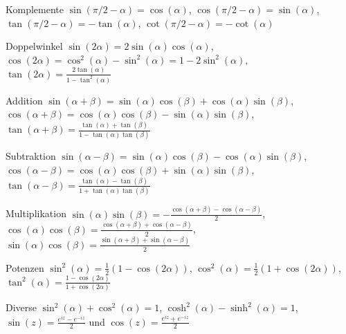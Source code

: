 \documentclass[a4paper,10pt]{article}
\begin{document}
\begin{subbox}{Komplemente}
$\sin(\pi/2 - \alpha) = \cos(\alpha)$, $\cos(\pi/2 - \alpha) = \sin(\alpha)$, $\tan(\pi/2 - \alpha) = -\tan(\alpha)$, $\cot(\pi/2 - \alpha) = -\cot(\alpha)$
\end{subbox}

\begin{subbox}{Doppelwinkel}
$\sin(2\alpha) = 2 \sin(\alpha) \cos(\alpha)$, $\cos(2\alpha) = \cos^2(\alpha) - \sin^2(\alpha) = 1 - 2 \sin^2(\alpha)$, $\tan(2\alpha) = \frac{2\tan(\alpha)}{1 - \tan^2(\alpha)}$
\end{subbox}

\begin{subbox}{Addition}
$\sin(\alpha + \beta) = \sin(\alpha) \cos(\beta) + \cos(\alpha) \sin(\beta)$, $\cos(\alpha + \beta) = \cos(\alpha) \cos(\beta) - \sin(\alpha) \sin(\beta)$, $\tan(\alpha + \beta) = \frac{\tan(\alpha) + \tan(\beta)}{1 - \tan(\alpha) \tan(\beta)}$
\end{subbox}

\begin{subbox}{Subtraktion}
$\sin(\alpha - \beta) = \sin(\alpha) \cos(\beta) - \cos(\alpha)\sin(\beta)$, $\cos(\alpha - \beta) = \cos(\alpha) \cos(\beta) + \sin(\alpha)\sin(\beta)$, $\tan(\alpha - \beta) = \frac{\tan(\alpha) - \tan(\beta)}{1+\tan(\alpha) \tan(\beta)}$
\end{subbox}

\begin{subbox}{Multiplikation}
$\sin(\alpha) \sin(\beta) = -\frac{\cos(\alpha + \beta) - \cos(\alpha - \beta)}{2}$, $\cos(\alpha) \cos(\beta) =  \frac{\cos(\alpha + \beta) + \cos(\alpha - \beta)}{2}$, $\sin(\alpha) \cos(\beta) =  \frac{\sin(\alpha + \beta) + \sin(\alpha - \beta)}{2}$
\end{subbox}

\begin{subbox}{Potenzen}
$\sin^2(\alpha) = \frac{1}{2}(1-\cos(2\alpha))$, $\cos^2(\alpha) = \frac{1}{2}(1+\cos(2\alpha))$, $\tan^2(\alpha) = \frac{1-\cos(2\alpha)}{1+\cos(2\alpha)}$
\end{subbox}

\begin{subbox}{Diverse}
$\sin^2(\alpha) + \cos^2(\alpha) = 1$, $\cosh^2(\alpha) - \sinh^2(\alpha) = 1$, $\sin(z) = \frac{e^{iz} - e^{-iz}}{2}$ und $\cos(z) = \frac{e^{iz} + e^{-iz}}{2}$
\end{subbox}
\end{document}
